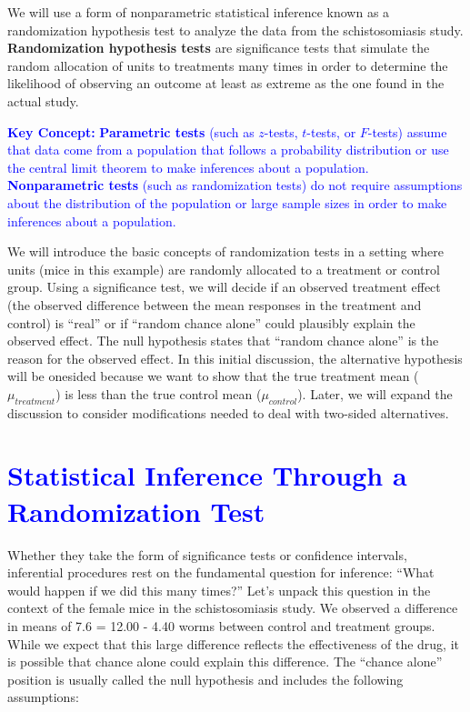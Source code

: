 \documentclass[
]{report}
\begin{document}
We will use a form of nonparametric statistical inference known as a randomization hypothesis test to analyze the data from the schistosomiasis study. \textbf{Randomization hypothesis tests} are significance tests that simulate the random allocation of units to treatments many times in order to determine the likelihood of observing an outcome at least as extreme as the one found in the actual study.

\textbf{\textcolor{blue}{Key Concept:}} \textcolor{blue}{\textbf{Parametric tests} (such as $\scriptstyle z$-tests, $\scriptstyle t$-tests, or $\scriptstyle F$-tests) assume that data come from a population that follows a probability distribution or use the central limit theorem to make inferences about a population. \textbf{Nonparametric tests} (such as randomization tests) do not require assumptions about the distribution of the population or large sample sizes in order to make inferences about a population.}

We will introduce the basic concepts of randomization tests in a setting where units (mice in this example) are randomly allocated to a treatment or control group. Using a significance test, we will decide if an observed treatment effect (the observed difference between the mean responses in the treatment and control) is ``real'' or if ``random chance alone'' could plausibly explain the observed effect. The null hypothesis states that ``random chance alone'' is the reason for the observed effect. In this initial discussion, the alternative hypothesis will be onesided because we want to show that the true treatment mean (\(\scriptstyle \mu_{treatment}\)) is less than the true control mean (\(\scriptstyle \mu_{control}\)). Later, we will expand the discussion to consider modifications needed to deal with two-sided alternatives.

\hypertarget{section-1}{%
\section{\texorpdfstring{\textcolor{blue}{Statistical Inference Through a Randomization Test}}{}}\label{section-1}}

Whether they take the form of significance tests or confidence intervals, inferential procedures rest on the fundamental question for inference: ``What would happen if we did this many times?'' Let's unpack this question in the context of the female mice in the schistosomiasis study. We observed a difference in means of 7.6 = 12.00 - 4.40 worms between control and treatment groups. While we expect that this large difference reflects the effectiveness of the drug, it is possible that chance alone could explain this difference. The ``chance alone'' position is usually called the null hypothesis and includes the following assumptions:
\end{document}
